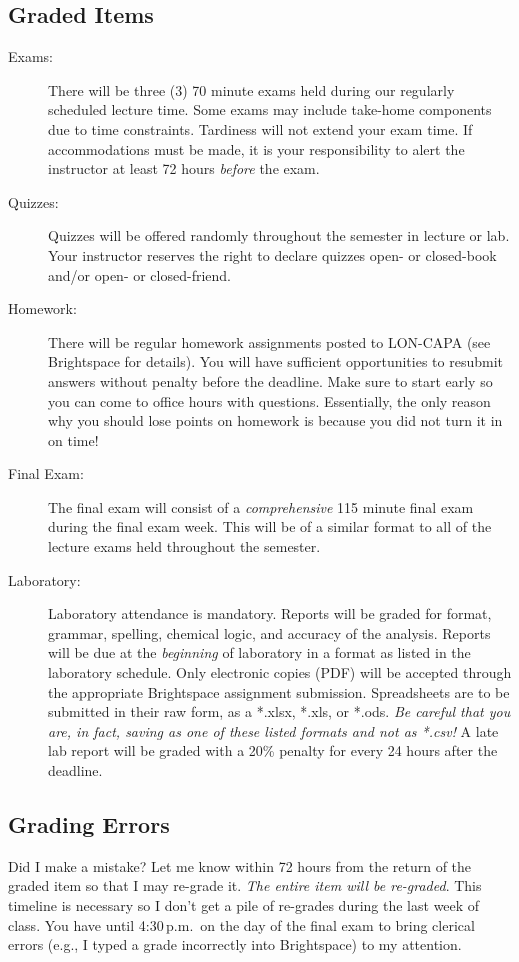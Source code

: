 \documentclass[11pt,letterpaper]{article}
\begin{document}
\subsection{Graded Items}
\begin{description}
	\item[Exams:] There will be three (3) 70 minute exams held during our
		regularly scheduled lecture time. Some exams may include
		take-home components due to time constraints. Tardiness will not extend your
		exam time. If accommodations must be made, it is your
		responsibility to alert the instructor at least 72 hours
		\emph{before} the exam.
	\item[Quizzes:] Quizzes will be offered randomly throughout the semester
		in lecture or lab. Your instructor reserves the right to declare
		quizzes open- or closed-book and/or open- or closed-friend.
	\item[Homework:] There will be regular homework assignments posted to
		LON-CAPA (see Brightspace for details). You will have sufficient
		opportunities to resubmit answers without penalty before the
		deadline. Make sure to start early so you can come to office
		hours with questions. Essentially, the only reason why you
		should lose points on homework is because you did not turn it in
		on time!
	\item[Final Exam:] The final exam will consist of a \emph{comprehensive}
		115 minute final exam during the final exam week. This will be
		of a similar format to all of the lecture exams held throughout
		the semester.
	\item[Laboratory:] Laboratory attendance is mandatory. Reports will be
		graded for format, grammar, spelling, chemical logic, and
		accuracy of the analysis. Reports will be due at the
		\emph{beginning} of laboratory in a format as listed in the
		laboratory schedule. Only electronic copies (PDF) will be accepted
		through the appropriate Brightspace assignment submission.
		Spreadsheets are to be submitted in their raw form, as a *.xlsx,
		*.xls, or *.ods. \emph{Be careful that you are, in fact, saving
		as one of these listed formats and not as *.csv!} A late lab
		report will be graded with a 20\% penalty for every 24 hours
		after the deadline.
\end{description}

\subsection{Grading Errors}
Did I make a mistake? Let me know within 72 hours from the return of the graded
item so that I may re-grade it. \emph{The entire item will be re-graded}. This
timeline is necessary so I don't get a pile of re-grades during the last week of
class. You have until 4:30\,p.m.\ on the day of the final exam to bring clerical
errors (e.g., I typed a grade incorrectly into Brightspace) to my attention.
\end{document}
